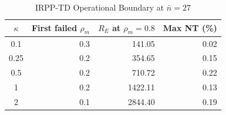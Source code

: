 \begin{table}[!t]
\centering
\caption{IRPP-TD Operational Boundary at $\bar n=27$}
\label{tab:rq3-boundary}
\scriptsize
\setlength{\tabcolsep}{4.2pt}
\renewcommand{\arraystretch}{1.08}
\begin{tabular}{crrr}
\toprule
$\kappa$ & First failed $\rho_m$ & $R_E$ at $\rho_m=0.8$ & Max NT (\%) \\
\midrule
0.1 & 0.3 & 141.05 & 0.02 \\
0.25 & 0.2 & 354.65 & 0.15 \\
0.5 & 0.2 & 710.72 & 0.22 \\
1 & 0.2 & 1422.11 & 0.13 \\
2 & 0.1 & 2844.40 & 0.19 \\
\bottomrule
\end{tabular}
\end{table}
